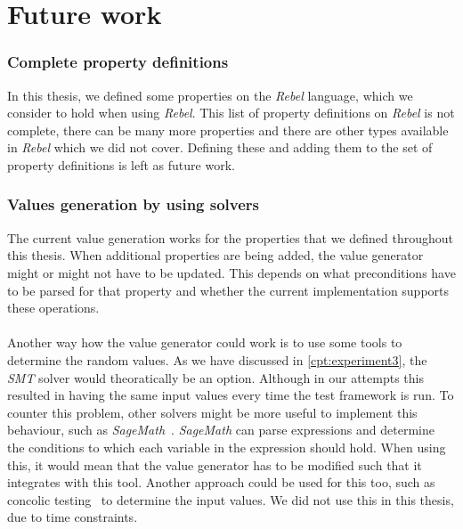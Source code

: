 \section{Future work}

\subsubsection{Complete property definitions}
In this thesis, we defined some properties on the \textit{Rebel} language,
which we consider to hold when using \textit{Rebel}. This list of property
definitions on \textit{Rebel} is not complete, there can be many more properties
and there are other types available in \textit{Rebel} which we did not cover.
Defining these and adding them to the set of property definitions is left as
future work.

\subsubsection{Values generation by using solvers}
The current value generation works for the properties that we defined throughout this thesis. When additional properties are being added, the value generator might or might not have to be updated. This depends on what preconditions have to be parsed for that property and whether the current implementation supports these operations.\\%
\\
Another way how the value generator could work is to use some tools to determine the random values. As we have discussed in \autoref{cpt:experiment3}, the \textit{SMT} solver would theoratically be an option. Although in our attempts this resulted in having the same input values every time the test framework is run. To counter this problem, other solvers might be more useful to implement this behaviour, such as \textit{SageMath}~\cite{siteSageMath2017}. \textit{SageMath} can parse expressions and determine the conditions to which each variable in the expression should hold. When using this, it would mean that the value generator has to be modified such that it integrates with this tool. Another approach could be used for this too, such as concolic testing~\cite{sen2006cute} to determine the input values. We did not use this in this thesis, due to time constraints.

